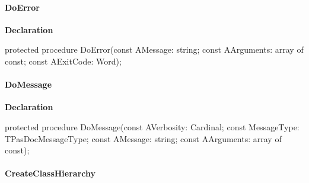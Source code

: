 \documentclass{report}
\newif\ifpdf
\begin{document}
\paragraph*{DoError}\hspace*{\fill}

\label{PasDoc_Gen.TDocGenerator-DoError}
\begin{list}{}{
\setlength{\itemindent}{0cm}
\setlength{\listparindent}{0cm}
\setlength{\leftmargin}{\evensidemargin}
\addtolength{\leftmargin}{\tmplength}
\settowidth{\labelsep}{X}
\addtolength{\leftmargin}{\labelsep}
\setlength{\labelwidth}{\tmplength}
}
\item[\textbf{Declaration}\hfill]
\ifpdf
\begin{flushleft}
\fi
\begin{ttfamily}
protected procedure DoError(const AMessage: string; const AArguments: array of const; const AExitCode: Word);\end{ttfamily}

\ifpdf
\end{flushleft}
\fi

\end{list}
\paragraph*{DoMessage}\hspace*{\fill}

\label{PasDoc_Gen.TDocGenerator-DoMessage}
\begin{list}{}{
\setlength{\itemindent}{0cm}
\setlength{\listparindent}{0cm}
\setlength{\leftmargin}{\evensidemargin}
\addtolength{\leftmargin}{\tmplength}
\settowidth{\labelsep}{X}
\addtolength{\leftmargin}{\labelsep}
\setlength{\labelwidth}{\tmplength}
}
\item[\textbf{Declaration}\hfill]
\ifpdf
\begin{flushleft}
\fi
\begin{ttfamily}
protected procedure DoMessage(const AVerbosity: Cardinal; const MessageType: TPasDocMessageType; const AMessage: string; const AArguments: array of const);\end{ttfamily}

\ifpdf
\end{flushleft}
\fi

\end{list}
\paragraph*{CreateClassHierarchy}\hspace*{\fill}
\end{document}
